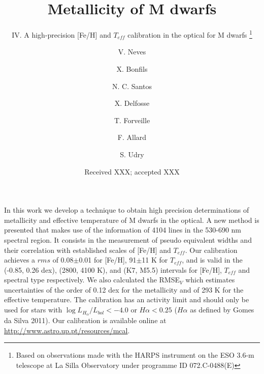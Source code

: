 \documentclass{aa}
\begin{document}
 


   \title{Metallicity of M dwarfs }

  \subtitle{IV. A high-precision [Fe/H] and $T_{eff}$ calibration in the optical for M dwarfs \thanks{Based on observations made with the HARPS instrument on the ESO 3.6-m telescope at La Silla Observatory under programme ID 072.C-0488(E)}}

\author{ V. Neves \and X. Bonfils \and
  N. C. Santos \and X. Delfosse \and
  T. Forveille  \and F. Allard  \and
  S. Udry}

   \date{Received XXX; accepted XXX}

 
  \abstract
{}
   {In this work we develop a technique to obtain high precision determinations of metallicity and effective temperature of M dwarfs in the optical.}
   {A new method is presented that makes use of the information of 4104 lines in the 530-690 nm spectral region. It consists in the measurement of pseudo equivalent widths and their correlation with established scales of [Fe/H] and $T_{eff}$.}
   {Our calibration achieves a $rms$ of 0.08$\pm$0.01 for [Fe/H], 91$\pm$11 K for $T_{eff}$, and is valid in the (-0.85, 0.26 dex), (2800, 4100 K), and (K7, M5.5) intervals for [Fe/H], $T_{eff}$ and spectral type respectively. We also calculated the RMSE$_{V}$ which estimates uncertainties of the order of 0.12 dex for the metallicity and of 293 K for the effective temperature. The calibration has an activity limit and should only be used for stars with  $\log{L_{H_{\alpha}}/L_{bol}} < -4.0$ or $H\alpha < 0.25$ ($H\alpha$ as defined by Gomes da Silva 2011). Our calibration is available online at \url{http://www.astro.up.pt/resources/mcal}.  }
   {}
\end{document}
